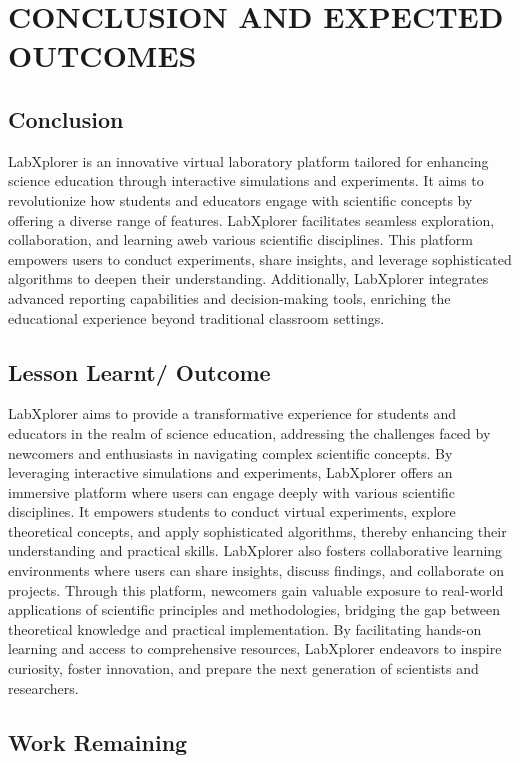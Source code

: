 \chapter{CONCLUSION AND EXPECTED OUTCOMES}
\section{Conclusion}
LabXplorer is an innovative virtual laboratory platform tailored for enhancing science education through interactive simulations and experiments. It aims to revolutionize how students and educators engage with scientific concepts by offering a diverse range of features. LabXplorer facilitates seamless exploration, collaboration, and learning aweb various scientific disciplines. This platform empowers users to conduct experiments, share insights, and leverage sophisticated algorithms to deepen their understanding. Additionally, LabXplorer integrates advanced reporting capabilities and decision-making tools, enriching the educational experience beyond traditional classroom settings.
\section{Lesson Learnt/ Outcome}
LabXplorer aims to provide a transformative experience for students and educators in the realm of science education, addressing the challenges faced by newcomers and enthusiasts in navigating complex scientific concepts. By leveraging interactive simulations and experiments, LabXplorer offers an immersive platform where users can engage deeply with various scientific disciplines. It empowers students to conduct virtual experiments, explore theoretical concepts, and apply sophisticated algorithms, thereby enhancing their understanding and practical skills. LabXplorer also fosters collaborative learning environments where users can share insights, discuss findings, and collaborate on projects. Through this platform, newcomers gain valuable exposure to real-world applications of scientific principles and methodologies, bridging the gap between theoretical knowledge and practical implementation. By facilitating hands-on learning and access to comprehensive resources, LabXplorer endeavors to inspire curiosity, foster innovation, and prepare the next generation of scientists and researchers.
\section{Work Remaining}